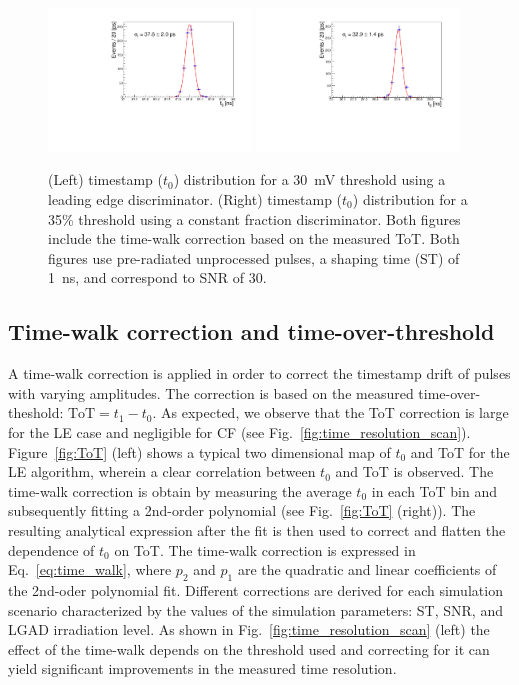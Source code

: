\documentclass[preprint,1p]{elsarticle}
\begin{document}
  \begin{figure}[htbp]
    \centering
    \includegraphics[width=0.48\textwidth]{figs/pre_rad_st_1ns_snr_30_le_tot_threshold_30mV.pdf} \hfill
    \includegraphics[width=0.48\textwidth]{figs/pre_rad_st_1ns_snr_30_cfd_tot_threshold_35_percent_v2.pdf}
    \caption{(Left) timestamp ($t_{0}$) distribution for a 30~\si{mV} threshold using a leading edge discriminator.
    (Right) timestamp ($t_{0}$) distribution for a 35\% threshold using a constant fraction discriminator. Both figures
    include the time-walk correction based on the measured ToT.
    Both figures use pre-radiated unprocessed pulses, a shaping time (ST) of 1~\si{ns}, and correspond to SNR of 30.}
    \label{fig:time_res}
  \end{figure}


\subsection{Time-walk correction and time-over-threshold}\label{sec:tw_and_tot}
A time-walk correction is applied in order to correct the timestamp drift of pulses with varying amplitudes.
The correction is based on the measured time-over-theshold: $\mathrm{ToT} = t_{1} - t_{0}$. As expected, we observe that the ToT correction
is large for the LE case and negligible for CF (see Fig.~\ref{fig:time_resolution_scan}).
Figure~\ref{fig:ToT} (left) shows a typical two dimensional map of $t_{0}$ and ToT for the
LE algorithm, wherein a clear correlation between $t_{0}$ and ToT is observed. The time-walk correction is obtain by measuring the average
$t_{0}$ in each ToT bin and subsequently fitting a 2nd-order polynomial (see Fig.~\ref{fig:ToT} (right)).
The resulting analytical expression after the fit is then used to correct and flatten the dependence of $t_{0}$ on ToT.
The time-walk correction is expressed in Eq.~\ref{eq:time_walk}, where $p_{2}$ and $p_{1}$ are the quadratic
and linear coefficients of the 2nd-oder polynomial fit. Different corrections are derived for each simulation scenario
characterized by the values of the simulation parameters: ST, SNR, and LGAD irradiation level.
As shown in Fig.~\ref{fig:time_resolution_scan} (left) the effect of the time-walk depends on the threshold used and correcting for it
can yield significant improvements in the measured time resolution.
\end{document}
